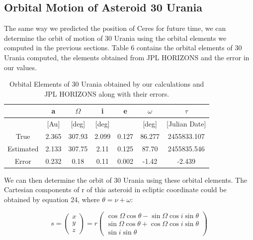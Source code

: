 \documentclass[letterpaper,12pt]{article}
\begin{document}
\subsection{Orbital Motion of Asteroid 30 Urania}
The same way we predicted the position of Ceres for future time, we can determine the orbit of motion of 30 Urania using the orbital elements we computed in the previous sections. Table 6 contains the orbital elements of 30 Urania computed, the elements obtained from JPL HORIZONS and the error in our values.


\FloatBarrier
\begin{table}[h!]
\caption{Orbital Elements of 30 Urania obtained by our calculations and JPL HORIZONS along with their errors.} %
\centering %
\begin{tabular}{| c | c | c | c | c | c | c |} %
\hline %
 & a & \begin{math} \Omega \end{math}  & i & e & \begin{math} \omega \end{math}  & \begin{math} \tau \end{math} \\ [0.5ex] %
\hline %
  & [Au]  &  [deg] &[deg] & & [deg] & [Julian Date] \\ \hline 
True & 2.365 & 307.93  &  2.099  & 0.127 &  86.277 & 2455833.107\\ \hline
Estimated & 2.133 &  307.75 & 2.11 &  0.125 & 87.70 & 2455835.546 \\ \hline
Error & 0.232 & 0.18  &  0.11   &  0.002  & -1.42 & -2.439\\[1ex] %
\hline %
\end{tabular}
\label{table:nonlin} %
\end{table}
\FloatBarrier

We can then determine the orbit of 30 Urania using these orbital elements. The Cartesian components of r of this asteroid in ecliptic coordinate could be obtained by equation 24, where \begin{math} \theta = \nu + \omega \end{math}:

\begin{equation}
s=
\begin{pmatrix}
  x \\
  y \\
  z
 \end{pmatrix} 
  =r
\begin{pmatrix}
\cos \Omega \cos \theta - \sin \Omega \cos i \sin \theta \\ 
 \sin \Omega \cos \theta+ \cos \Omega \cos i \sin \theta \\ 
 \sin i \sin \theta
\end{pmatrix}
\end{equation}
\end{document}
